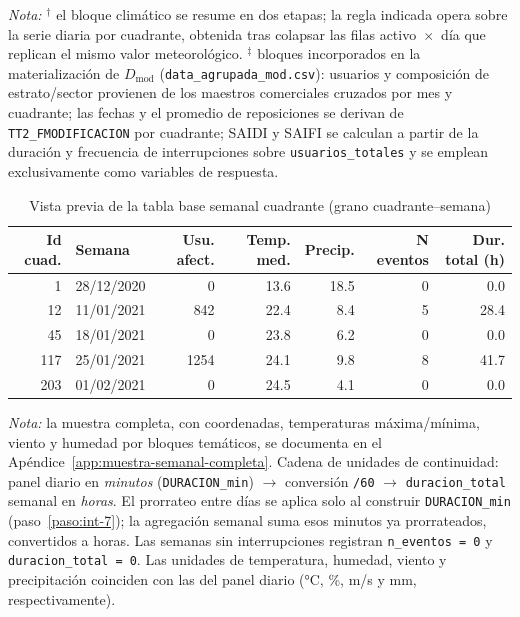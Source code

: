 \begin{table}[!htbp]
    \noindent\textit{Nota:} $^{\dagger}$ el bloque climático se resume en dos etapas; la regla indicada opera sobre la serie diaria por cuadrante, obtenida tras colapsar las filas activo~$\times$~día que replican el mismo valor meteorológico. $^{\ddagger}$ bloques incorporados en la materialización de $D_{\mathrm{mod}}$ (\texttt{data\_agrupada\_mod.csv}): usuarios y composición de estrato/sector provienen de los maestros comerciales cruzados por mes y cuadrante; las fechas y el promedio de reposiciones se derivan de \texttt{TT2\_FMODIFICACION} por cuadrante; SAIDI y SAIFI se calculan a partir de la duración y frecuencia de interrupciones sobre \texttt{usuarios\_totales} y se emplean exclusivamente como variables de respuesta.
    \end{table}
    
    \begin{table}[!htbp]
    \centering
    \small
    \caption{Vista previa de la tabla base semanal cuadrante (grano cuadrante--semana)}
    \label{tab:muestra_semanal_preview}
    \begin{tabular}{r l r r r r r}
    \toprule
    \textbf{Id cuad.} & \textbf{Semana} & \textbf{Usu. afect.} & \textbf{Temp. med.} & \textbf{Precip.} & \textbf{N eventos} & \textbf{Dur. total (h)} \\
    \midrule
      1 & 28/12/2020 &    0 & 13.6 & 18.5 & 0 &  0.0 \\
     12 & 11/01/2021 &  842 & 22.4 &  8.4 & 5 & 28.4 \\
     45 & 18/01/2021 &    0 & 23.8 &  6.2 & 0 &  0.0 \\
    117 & 25/01/2021 & 1254 & 24.1 &  9.8 & 8 & 41.7 \\
    203 & 01/02/2021 &    0 & 24.5 &  4.1 & 0 &  0.0 \\
    \bottomrule
    \end{tabular}
    \end{table}

    \noindent\textit{Nota:} la muestra completa, con coordenadas, temperaturas máxima/mínima, viento y humedad por bloques temáticos, se documenta en el Apéndice~\ref{app:muestra-semanal-completa}. Cadena de unidades de continuidad: panel diario en \textit{minutos} (\texttt{DURACION\_min}) $\rightarrow$ conversión \texttt{/60} $\rightarrow$ \texttt{duracion\_total} semanal en \textit{horas}. El prorrateo entre días se aplica solo al construir \texttt{DURACION\_min} (paso~\ref{paso:int-7}); la agregación semanal suma esos minutos ya prorrateados, convertidos a horas. Las semanas sin interrupciones registran \texttt{n\_eventos = 0} y \texttt{duracion\_total = 0}. Las unidades de temperatura, humedad, viento y precipitación coinciden con las del panel diario (°C, \%, m/s y mm, respectivamente).


